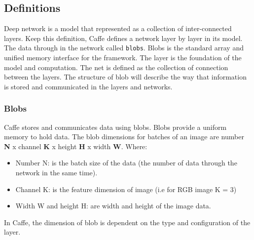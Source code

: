 \subsection{Definitions}
Deep network is a model that represented as a collection of inter-connected layers. Keep this definition, Caffe defines a network layer by layer in its model. The data through in the network called \texttt{blobs}. Blobs is the standard array and unified memory interface for the framework. The layer is the foundation of the model and computation. The net is defined as the collection of connection between the layers. The structure of blob will describe the way that information is stored and communicated in the layers and networks.
\subsubsection{Blobs}
Caffe stores and communicates data using blobs. Blobs provide a uniform memory to hold data. The blob dimensions for batches of an image are number \textbf{N} x channel \textbf{K} x height \textbf{H} x width \textbf{W}. Where:
\begin{itemize}
	\item Number N: is the batch size of the data (the number of data through the network in the same time).
	\item Channel K: is the feature dimension of image (i.e for RGB image K = 3)
	\item Width W and height H: are width and height of the image data.
\end{itemize}
In Caffe, the dimension of blob is dependent on the type and configuration of the layer.
